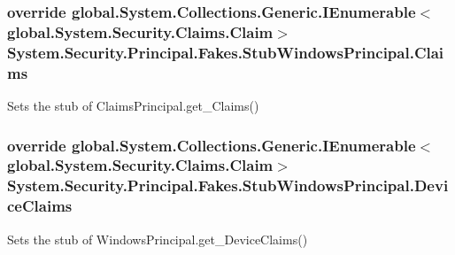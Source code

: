 \hypertarget{class_system_1_1_security_1_1_principal_1_1_fakes_1_1_stub_windows_principal_a62d758e5a69fc40068225ea3ad52383e}{
\subsubsection[{Claims}]{\setlength{\rightskip}{0pt plus 5cm}override global.\-System.\-Collections.\-Generic.\-I\-Enumerable$<$global.\-System.\-Security.\-Claims.\-Claim$>$ System.\-Security.\-Principal.\-Fakes.\-Stub\-Windows\-Principal.\-Claims\hspace{0.3cm}{\ttfamily [get]}}}\label{class_system_1_1_security_1_1_principal_1_1_fakes_1_1_stub_windows_principal_a62d758e5a69fc40068225ea3ad52383e}


Sets the stub of Claims\-Principal.\-get\-\_\-\-Claims()

\hypertarget{class_system_1_1_security_1_1_principal_1_1_fakes_1_1_stub_windows_principal_a0d4613e0a0d07f1b72a5f11f62d4fe0f}{
\subsubsection[{Device\-Claims}]{\setlength{\rightskip}{0pt plus 5cm}override global.\-System.\-Collections.\-Generic.\-I\-Enumerable$<$global.\-System.\-Security.\-Claims.\-Claim$>$ System.\-Security.\-Principal.\-Fakes.\-Stub\-Windows\-Principal.\-Device\-Claims\hspace{0.3cm}{\ttfamily [get]}}}\label{class_system_1_1_security_1_1_principal_1_1_fakes_1_1_stub_windows_principal_a0d4613e0a0d07f1b72a5f11f62d4fe0f}


Sets the stub of Windows\-Principal.\-get\-\_\-\-Device\-Claims()

